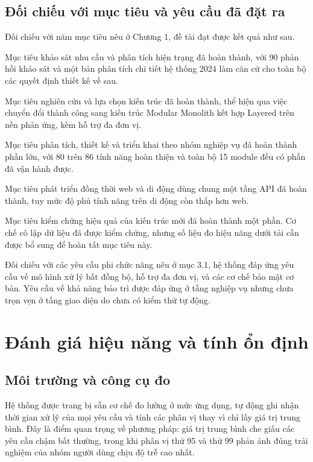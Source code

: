 \documentclass[12pt,a4paper,oneside]{report}
\begin{document}
\subsection{Đối chiếu với mục tiêu và yêu cầu đã đặt ra}

Đối chiếu với năm mục tiêu nêu ở Chương 1, đề tài đạt được kết quả như sau.

Mục tiêu khảo sát nhu cầu và phân tích hiện trạng đã hoàn thành, với 90 phản hồi khảo sát và một bản phân tích chi tiết hệ thống 2024 làm căn cứ cho toàn bộ các quyết định thiết kế về sau.

Mục tiêu nghiên cứu và lựa chọn kiến trúc đã hoàn thành, thể hiện qua việc chuyển đổi thành công sang kiến trúc Modular Monolith kết hợp Layered trên nền phản ứng, kèm hỗ trợ đa đơn vị.

Mục tiêu phân tích, thiết kế và triển khai theo nhóm nghiệp vụ đã hoàn thành phần lớn, với 80 trên 86 tính năng hoàn thiện và toàn bộ 15 module đều có phần đã vận hành được.

Mục tiêu phát triển đồng thời web và di động dùng chung một tầng API đã hoàn thành, tuy mức độ phủ tính năng trên di động còn thấp hơn web.

Mục tiêu kiểm chứng hiệu quả của kiến trúc mới đã hoàn thành một phần. Cơ chế cô lập dữ liệu đã được kiểm chứng, nhưng số liệu đo hiệu năng dưới tải cần được bổ sung để hoàn tất mục tiêu này.

Đối chiếu với các yêu cầu phi chức năng nêu ở mục 3.1, hệ thống đáp ứng yêu cầu về mô hình xử lý bất đồng bộ, hỗ trợ đa đơn vị, và các cơ chế bảo mật cơ bản. Yêu cầu về khả năng bảo trì được đáp ứng ở tầng nghiệp vụ nhưng chưa trọn vẹn ở tầng giao diện do chưa có kiểm thử tự động.

\section{Đánh giá hiệu năng và tính ổn định}

\subsection{Môi trường và công cụ đo}

Hệ thống được trang bị sẵn cơ chế đo lường ở mức ứng dụng, tự động ghi nhận thời gian xử lý của mọi yêu cầu và tính các phân vị thay vì chỉ lấy giá trị trung bình. Đây là điểm quan trọng về phương pháp: giá trị trung bình che giấu các yêu cầu chậm bất thường, trong khi phân vị thứ 95 và thứ 99 phản ánh đúng trải nghiệm của nhóm người dùng chịu độ trễ cao nhất.
\end{document}

